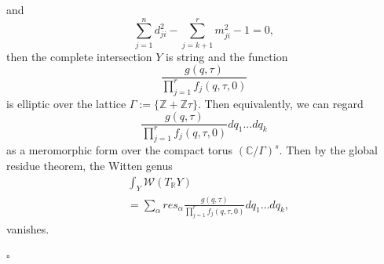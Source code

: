 \documentclass[11pt]{article}
\newcommand{\reals}{\mathbb R}
\newcommand{\cplx}{\mathbb C}
\newcommand{\intg}{\mathbb Z}
\renewcommand{\qedsymbol}{$\square$}
\begin{document}
and
$$
\sum_{j=1}^n d_{ji}^2-\sum_{j=k+1}^r m_{ji}^2-1=0,
$$
then the complete intersection $Y$ is string and
the function 
\begin{equation*}
\frac{g(q,\tau)}{\prod_{j=1}^r f_j (q,\tau,0)}
\end{equation*}
is elliptic over the lattice $\Gamma:=\{\intg+\intg\tau\}$. Then equivalently, we 
can regard 
\begin{equation*}
\frac{g(q,\tau)}{\prod_{j=1}^r f_j (q,\tau,0)}dq_1...dq_k
\end{equation*}
as a meromorphic form over the compact torus $(\cplx/\Gamma)^s$.
Then by the global residue theorem, the Witten genus
\begin{equation*}
\begin{aligned}
&\int_{Y} \mathcal{W}(T_\reals Y) \\
&=\sum_\alpha res_\alpha \frac{g(q,\tau)}{\prod_{j=1}^r f_j (q,\tau,0)}dq_1...dq_k,
\end{aligned}
\end{equation*}
vanishes.
\begin{flushright}
\qedsymbol
\end{flushright}

\end{document}
